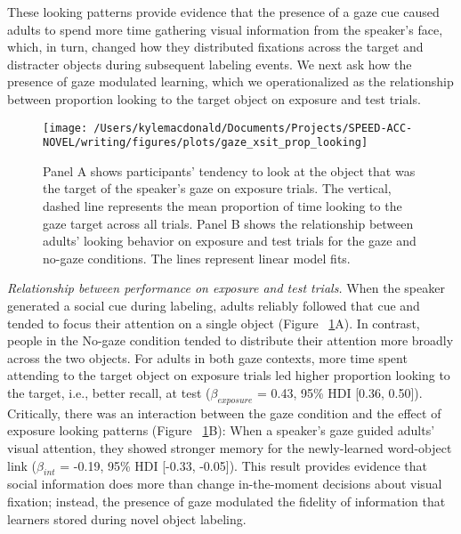 \documentclass[man,floatsintext]{apa6}
\begin{document}
These looking patterns provide evidence that the presence of a gaze cue
caused adults to spend more time gathering visual information from the
speaker's face, which, in turn, changed how they distributed fixations
across the target and distracter objects during subsequent labeling
events. We next ask how the presence of gaze modulated learning, which
we operationalized as the relationship between proportion looking to the
target object on exposure and test trials.

\begin{figure}[!t]

{\centering \texttt{[image: /Users/kylemacdonald/Documents/Projects/SPEED-ACC-NOVEL/writing/figures/plots/gaze\_xsit\_prop\_looking]} 

}

\caption{Panel A shows participants’ tendency to look at the object that was the target of the speaker’s gaze on exposure trials. The vertical, dashed line represents the mean proportion of time looking to the gaze target across all trials. Panel B shows the relationship between adults' looking behavior on exposure and test trials for the gaze and no-gaze conditions. The lines represent linear model fits.}\label{fig:gaze-xsit-prop-looking-plot}
\end{figure}

\emph{Relationship between performance on exposure and test trials.}
When the speaker generated a social cue during labeling, adults reliably
followed that cue and tended to focus their attention on a single object
(Figure ~\ref{fig:gaze-xsit-prop-looking-plot}A). In contrast, people in
the No-gaze condition tended to distribute their attention more broadly
across the two objects. For adults in both gaze contexts, more time
spent attending to the target object on exposure trials led higher
proportion looking to the target, i.e., better recall, at test
(\(\beta_{exposure}\) = 0.43, 95\% HDI {[}0.36, 0.50{]}). Critically,
there was an interaction between the gaze condition and the effect of
exposure looking patterns (Figure
~\ref{fig:gaze-xsit-prop-looking-plot}B): When a speaker's gaze guided
adults' visual attention, they showed stronger memory for the
newly-learned word-object link (\(\beta_{int}\) = -0.19, 95\% HDI
{[}-0.33, -0.05{]}). This result provides evidence that social
information does more than change in-the-moment decisions about visual
fixation; instead, the presence of gaze modulated the fidelity of
information that learners stored during novel object labeling.
\end{document}
